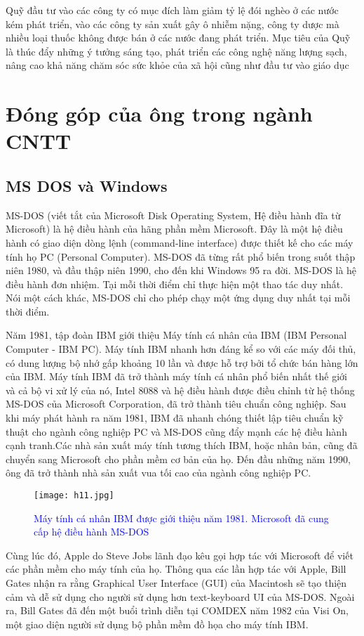\documentclass[12pt,a4paper]{article}  %
\begin{document}
	\noindent Quỹ đầu tư vào các công ty có mục đích làm giảm tỷ lệ đói nghèo ở các nước kém phát triển, vào các công ty sản xuất gây ô nhiễm nặng, công ty dược mà nhiều loại thuốc không được bán ở các nước đang phát triển. Mục tiêu của Quỹ là thúc đẩy những ý tưởng sáng tạo, phát triển các công nghệ năng lượng sạch, nâng cao khả năng chăm sóc sức khỏe của xã hội cũng như đầu tư vào giáo dục
\section{Đóng góp của ông trong ngành CNTT}
\subsection{MS DOS và Windows}
MS-DOS (viết tắt của Microsoft Disk Operating System, Hệ điều hành đĩa từ Microsoft) là hệ điều hành của hãng phần mềm Microsoft. Đây là một hệ điều hành có giao diện dòng lệnh (command-line interface) được thiết kế cho các máy tính họ PC (Personal Computer). MS-DOS đã từng rất phổ biến trong suốt thập niên 1980, và đầu thập niên 1990, cho đến khi Windows 95 ra đời. MS-DOS là hệ điều hành đơn nhiệm. Tại mỗi thời điểm chỉ thực hiện một thao tác duy nhất. Nói một cách khác, MS-DOS chỉ cho phép chạy một ứng dụng duy nhất tại mỗi thời điểm.

\noindent Năm 1981, tập đoàn IBM giới thiệu Máy tính cá nhân của IBM (IBM Personal Computer - IBM PC). Máy tính IBM nhanh hơn đáng kể so với các máy đối thủ, có dung lượng bộ nhớ gấp khoảng 10 lần và được hỗ trợ bởi tổ chức bán hàng lớn của IBM. Máy tính IBM đã trở thành máy tính cá nhân phổ biến nhất thế giới và cả bộ vi xử lý của nó, Intel 8088 và hệ điều hành được điều chỉnh từ hệ thống MS-DOS của Microsoft Corporation, đã trở thành tiêu chuẩn công nghiệp. Sau khi máy phát hành ra năm 1981, IBM đã nhanh chóng thiết lập tiêu chuẩn kỹ thuật cho ngành công nghiệp PC và MS-DOS cũng đẩy mạnh các hệ điều hành cạnh tranh.Các nhà sản xuất máy tính tương thích IBM, hoặc nhân bản, cũng đã chuyển sang Microsoft cho phần mềm cơ bản của họ. Đến đầu những năm 1990, ông đã trở thành nhà sản xuất vua tối cao của ngành công nghiệp PC.
\begin{figure}[h!]
	\texttt{[image: h11.jpg]}
	\captionsetup{labelformat=empty}
	\caption{\textcolor{blue}{Máy tính cá nhân IBM được giới thiệu năm 1981. Microsoft đã cung cấp hệ điều hành MS-DOS}}
\end{figure}
Cùng lúc đó, Apple do Steve Jobs lãnh đạo kêu gọi hợp tác với Microsoft để viết các phần mềm cho máy tính của họ. Thông qua các lần hợp tác với Apple, Bill Gates nhận ra rằng Graphical User Interface (GUI) của Macintosh sẽ tạo thiện cảm và dễ sử dụng cho người sử dụng hơn text-keyboard UI của MS-DOS. Ngoài ra, Bill Gates đã đến một buổi trình diễn tại COMDEX năm 1982 của Visi On, một giao diện người sử dụng bộ phần mềm đồ họa cho máy tính IBM.
\end{document}
